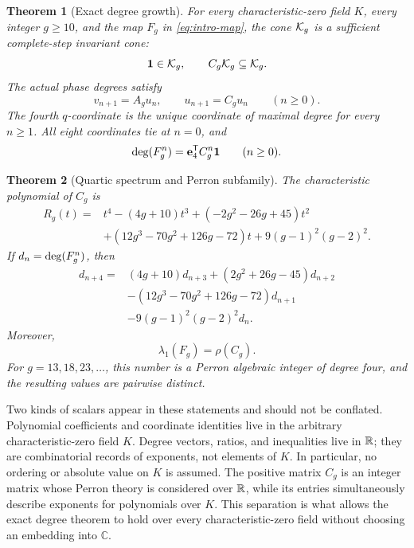 \documentclass[11pt]{article}
\newtheorem{theorem}{Theorem}[section]
\theoremstyle{remark}
\numberwithin{equation}{section}
\begin{document}
\begin{theorem}[Exact degree growth]\label{thm:degree}
For every characteristic-zero field \(K\), every integer \(g\geq10\), and
the map \(F_g\) in \eqref{eq:intro-map}, the cone
\(\mathcal{K}_g\) is a sufficient complete-step invariant cone:
\[
\mathbf{1}\in\mathcal{K}_g,\qquad C_g\mathcal{K}_g\subseteq\mathcal{K}_g.
\]
The actual phase degrees satisfy
\begin{equation}\label{eq:vector-recurrence}
v_{n+1}=A_gu_n,\qquad u_{n+1}=C_gu_n
\qquad(n\geq0).
\end{equation}
The fourth \(q\)-coordinate is the unique coordinate of maximal degree for
every \(n\geq1\).  All eight coordinates tie at \(n=0\), and
\begin{equation}\label{eq:exact-degree}
\operatorname{deg}(F_g^n)=\mathbf{e}_4^{\mathsf{T}}C_g^n\mathbf{1}
\qquad(n\geq0).
\end{equation}
\end{theorem}

\begin{theorem}[Quartic spectrum and Perron subfamily]\label{thm:spectrum}
The characteristic polynomial of \(C_g\) is
\begin{equation}\label{eq:R-preview}
\begin{aligned}
R_g(t)={}&t^4-(4g+10)t^3+(-2g^2-26g+45)t^2\\
&+(12g^3-70g^2+126g-72)t
+9(g-1)^2(g-2)^2.
\end{aligned}
\end{equation}
If \(d_n=\operatorname{deg}(F_g^n)\), then
\begin{equation}\label{eq:recurrence-preview}
\begin{aligned}
d_{n+4}={}&(4g+10)d_{n+3}
+(2g^2+26g-45)d_{n+2}\\
&-(12g^3-70g^2+126g-72)d_{n+1}\\
&-9(g-1)^2(g-2)^2d_n.
\end{aligned}
\end{equation}
Moreover,
\[
\lambda_1(F_g)=\rho(C_g).
\]
For \(g=13,18,23,\ldots\), this number is a Perron algebraic integer of
degree four, and the resulting values are pairwise distinct.
\end{theorem}

Two kinds of scalars appear in these statements and should not be
conflated.  Polynomial coefficients and coordinate identities live in the
arbitrary characteristic-zero field \(K\).  Degree vectors, ratios, and
inequalities live in \(\mathbb{R}\); they are combinatorial records of exponents,
not elements of \(K\).  In particular, no ordering or absolute value on
\(K\) is assumed.  The positive matrix \(C_g\) is an integer matrix whose
Perron theory is considered over \(\mathbb{R}\), while its entries simultaneously
describe exponents for polynomials over \(K\).  This separation is what
allows the exact degree theorem to hold over every characteristic-zero
field without choosing an embedding into \(\mathbb C\).
\end{document}
